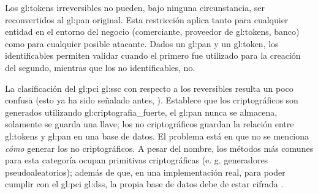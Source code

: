 Los \glspl{gl:token} irreversibles no pueden, bajo ninguna circunstancia, ser
reconvertidos al \gls{gl:pan} original. Esta restricción aplica tanto para
cualquier entidad en el entorno del negocio (comerciante, proveedor de
\glspl{gl:token}, banco) como para cualquier posible atacante. Dados un
\gls{gl:pan} y un \gls{gl:token}, los identificables permiten validar cuando el
primero fue utilizado para la creación del segundo, mientras que los no
identificables, no.



La clasificación del \gls{gl:pci} \gls{gl:ssc} con respecto a los reversibles
resulta un poco confusa (esto ya ha sido señalado antes, \cite{doc_sandra}).
Establece que los criptográficos son generados utilizando
\gls{gl:criptografia_fuerte}, el \gls{gl:pan} nunca se almacena, solamente se
guarda una llave; los no criptográficos guardan la relación entre
\glspl{gl:token} y \gls{gl:pan} en una base de datos. El problema está en que
no se menciona \textit{cómo} generar los no criptográficos. A pesar del nombre,
los métodos más comunes para esta categoría ocupan primitivas criptográficas
(e. g. generadores pseudoaleatorios); además de que, en una implementación
real, para poder cumplir con el \gls{gl:pci} \gls{gl:dss}, la propia base de
datos debe de estar cifrada \cite{pci_dss}.




